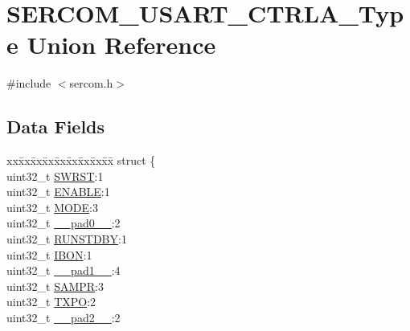 \hypertarget{union_s_e_r_c_o_m___u_s_a_r_t___c_t_r_l_a___type}{}\section{S\+E\+R\+C\+O\+M\+\_\+\+U\+S\+A\+R\+T\+\_\+\+C\+T\+R\+L\+A\+\_\+\+Type Union Reference}
\label{union_s_e_r_c_o_m___u_s_a_r_t___c_t_r_l_a___type}


{\ttfamily \#include $<$sercom.\+h$>$}

\subsection*{Data Fields}
\begin{DoxyCompactItemize}
\item 
\begin{tabbing}
xx\=xx\=xx\=xx\=xx\=xx\=xx\=xx\=xx\=\kill
struct \{\\
\>uint32\_t \mbox{\hyperlink{union_s_e_r_c_o_m___u_s_a_r_t___c_t_r_l_a___type_a34cd956a8da179cbd5fc9060306d420e}{SWRST}}:1\\
\>uint32\_t \mbox{\hyperlink{union_s_e_r_c_o_m___u_s_a_r_t___c_t_r_l_a___type_a66f979832c85e0692bd9422b05aff1f7}{ENABLE}}:1\\
\>uint32\_t \mbox{\hyperlink{union_s_e_r_c_o_m___u_s_a_r_t___c_t_r_l_a___type_aad9612db6a93afb1482213d2d36f1c5e}{MODE}}:3\\
\>uint32\_t \mbox{\hyperlink{union_s_e_r_c_o_m___u_s_a_r_t___c_t_r_l_a___type_a3e57c2ef1c3ffb36722f000cc1156824}{\_\_pad0\_\_}}:2\\
\>uint32\_t \mbox{\hyperlink{union_s_e_r_c_o_m___u_s_a_r_t___c_t_r_l_a___type_a5656560aef3eaf5aac89b68b9fe39c3a}{RUNSTDBY}}:1\\
\>uint32\_t \mbox{\hyperlink{union_s_e_r_c_o_m___u_s_a_r_t___c_t_r_l_a___type_aa72c38a0b61edb45766092a3f25ffe9b}{IBON}}:1\\
\>uint32\_t \mbox{\hyperlink{union_s_e_r_c_o_m___u_s_a_r_t___c_t_r_l_a___type_a6712ba6dd1d5b43d2d56ff8ac4e275a7}{\_\_pad1\_\_}}:4\\
\>uint32\_t \mbox{\hyperlink{union_s_e_r_c_o_m___u_s_a_r_t___c_t_r_l_a___type_a16285edd72ed025e226c2074f49dfe14}{SAMPR}}:3\\
\>uint32\_t \mbox{\hyperlink{union_s_e_r_c_o_m___u_s_a_r_t___c_t_r_l_a___type_a60f2ff8502d52acbfb411cf58dd75dcb}{TXPO}}:2\\
\>uint32\_t \mbox{\hyperlink{union_s_e_r_c_o_m___u_s_a_r_t___c_t_r_l_a___type_a9ce12a63de64ef64ae2d59d128251cae}{\_\_pad2\_\_}}:2\\

\end{tabbing}
\end{DoxyCompactItemize}
